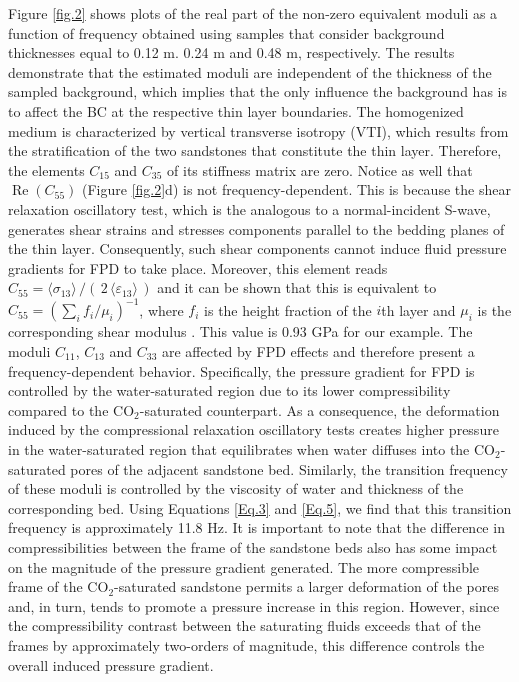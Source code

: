 \documentclass[draft]{agujournal2019}
\renewcommand{\Re}{\operatorname{Re} }
\begin{document}
Figure \ref{fig.2} shows plots of the real part of the non-zero equivalent moduli as a function of frequency obtained using samples that consider background thicknesses equal to 0.12 m. 0.24 m and 0.48 m, respectively. The results demonstrate that the estimated moduli are independent of the thickness of the sampled background, which implies that the only influence the background has is to affect the BC at the respective thin layer boundaries. 
The homogenized medium is
characterized by vertical transverse isotropy (VTI), which results from the stratification   of the two sandstones that constitute the thin layer. Therefore, the elements $C_{15}$ and $C_{35}$ of its stiffness matrix are zero. Notice as well that $\Re(C_{55})$  (Figure \ref{fig.2}d) is not frequency-dependent. This is because the shear relaxation oscillatory test, which is the analogous to a normal-incident S-wave, generates shear strains and stresses components  parallel to the bedding planes of the thin layer. Consequently, such shear components cannot induce fluid pressure gradients for FPD to take place. Moreover, this element reads $C_{55} = \langle \sigma_{13}\rangle\,/(\,2\, \langle \varepsilon_{13} \rangle\,)$ and it can be shown that this is equivalent to $C_{55}  =\left( \sum_i f_i/\mu_i \right)^{-1}$, where $f_i$ is the height fraction of the $i$th layer and $\mu_i$ is the corresponding shear modulus \cite{Backus1962, Salamon1968}. This value is 0.93 GPa for our example. The moduli  $C_{11}$, $C_{13}$ and $C_{33}$ are affected by FPD effects and therefore present a frequency-dependent behavior. Specifically, the pressure gradient for FPD is controlled by the water-saturated region due to its lower compressibility compared to the CO$_2$-saturated counterpart. As a consequence, the deformation induced by the compressional relaxation oscillatory tests creates higher pressure in the water-saturated region that equilibrates when water diffuses into the CO$_2$-saturated pores of the adjacent sandstone bed. Similarly, the transition frequency of these moduli is controlled by the viscosity of water and thickness of the corresponding bed. Using Equations \eqref{Eq.3} and \eqref{Eq.5}, we find that this transition frequency is approximately 11.8 Hz. It is important to note  that the difference in compressibilities between the frame of the sandstone beds also has some impact on the magnitude of the pressure gradient generated. The more compressible frame of the CO$_2$-saturated sandstone permits a larger deformation of the pores  and, in turn, tends to promote a pressure increase in this region. However, since the compressibility contrast between the saturating fluids exceeds that of the frames by approximately two-orders of magnitude, this difference controls the overall induced pressure gradient. 
\end{document}
